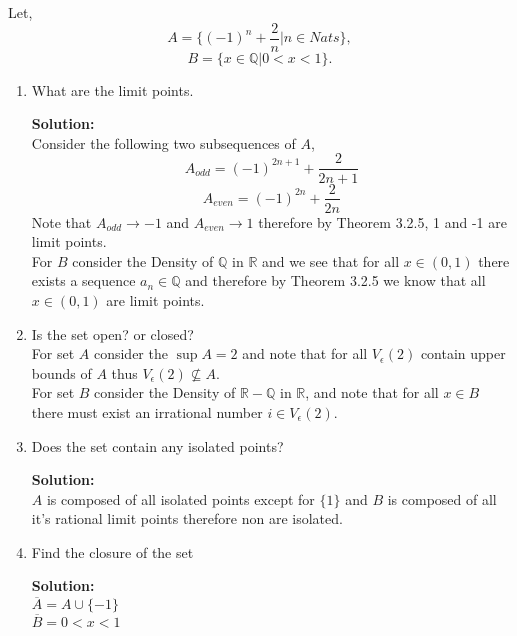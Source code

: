 \documentclass[12pt]{article}
\makeatletter
\theoremstyle{homework}
\newenvironment{exercise}[1]
{\def\@currentlabel{#1}\exercisecore}
{\endexercisecore}
\newcommand{\localhead}[1]{\par\smallskip\noindent\textbf{#1}\nobreak\\}%
\newcommand\solution{\localhead{Solution:}}
\newcommand{\Reals}{\ensuremath{\mathbb R}}
\newcommand{\Rats}{\ensuremath{\mathbb Q}}
\makeatother
\begin{document}
\begin{exercise}{3.2.2} Let,
  \begin{equation*}
    A = \{(-1)^n + \dfrac{2}{n}| n \in Nats \},
  \end{equation*}
  \begin{equation*}
    B = \{x \in \Rats | 0 < x < 1 \}.
  \end{equation*}
  \begin{enumerate}
    \item What are the limit points.\\
    
    \solution Consider the following two subsequences of $A$,
    \begin{equation*}
      A_{odd} = (-1)^{2n+1} + \dfrac{2}{2n+1}
    \end{equation*}
    \begin{equation*}
      A_{even} = (-1)^{2n} + \dfrac{2}{2n}
    \end{equation*}
    Note that $A_{odd} \to -1$ and $A_{even} \to 1$ therefore by Theorem 3.2.5, 1 and -1 are limit points.\\

    For $B$ consider the Density of $\Rats$ in $\Reals$ and we see that for all $x \in (0,1)$ there exists a sequence $a_n \in \Rats$ and therefore by 
    Theorem 3.2.5 we know that all $x \in (0,1)$ are limit points.

    \vspace{.25in}

    \item Is the set open? or closed?\\
    
    For set $A$ consider the $\sup A = 2$ and note that for all $V_{\epsilon}(2)$ contain upper bounds of $A$ thus $V_{\epsilon}(2) \not\subseteq A$.\\

    For set $B$ consider the Density of $\Reals - \Rats$ in $\Reals$, and note that for all $x \in B$ there must exist an irrational number $i \in V_{\epsilon}(2)$.
    \vspace{.25in}

    \item Does the set contain any isolated points?\\
    \solution $A$ is composed of all isolated points except for $\{1\}$ and $B$ is composed of all it's rational limit points therefore non are isolated. 
    \vspace{.25in}

    \item Find the closure of the set\\
    \solution $\overline{A} = A \cup \{-1\}$\\
    $\overline{B} = 0 < x < 1$
  \end{enumerate}
\end{exercise}
\end{document}
